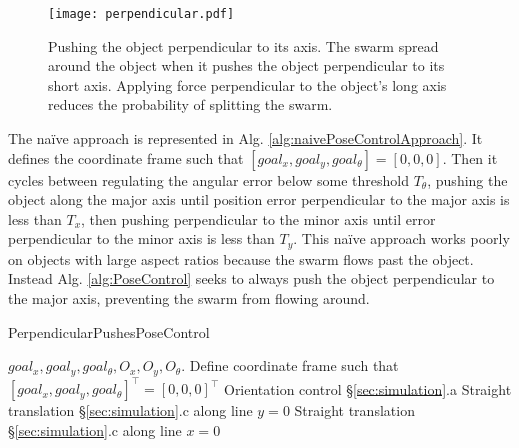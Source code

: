 \begin{figure}
\begin{center}
	\texttt{[image: perpendicular.pdf]}
\end{center}
\vspace{-1em}
\caption{\label{fig:perpendicular} 
Pushing the object perpendicular to its axis. The swarm spread around the object when it pushes the object perpendicular to its short axis. Applying force perpendicular to the object's long axis reduces the probability of splitting the swarm.
}
\vspace{-1em}
\end{figure}

The na\"{i}ve approach is represented in Alg. \ref{alg:naivePoseControlApproach}. It defines  the coordinate frame such that $[goal_x, goal_y, goal_{\theta}] = [0,0,0]$.
Then it cycles between regulating the angular error below some threshold $T_{\theta}$,
pushing the object along the major axis until position error perpendicular to the major axis is less than $T_x$, then pushing perpendicular to the minor axis until error perpendicular to the minor axis is less than $T_y$. 
This na\"{i}ve approach works poorly on objects with large aspect ratios because the swarm flows past the object. 
Instead Alg. \ref{alg:PoseControl} seeks to always push the object perpendicular to the major axis, preventing the swarm from flowing around. 


\begin{algorithm}
\caption{PerpendicularPushesPoseControl}\label{alg:naivePoseControlApproach}
\begin{algorithmic}[1]
\Require $goal_x, goal_y, goal_{\theta},O_x, O_y, O_{\theta}$.
\State Define coordinate frame such that $[goal_x, goal_y, goal_{\theta}]^\top = [0,0,0]^\top$
		\State Orientation control \S\ref{sec:simulation}.a
	\EndWhile
		\State Straight translation \S\ref{sec:simulation}.c along line $y = 0$
	\EndWhile
		\State Straight translation \S\ref{sec:simulation}.c along line $x = 0$
	\EndWhile
\EndWhile
\end{algorithmic}
\end{algorithm}



